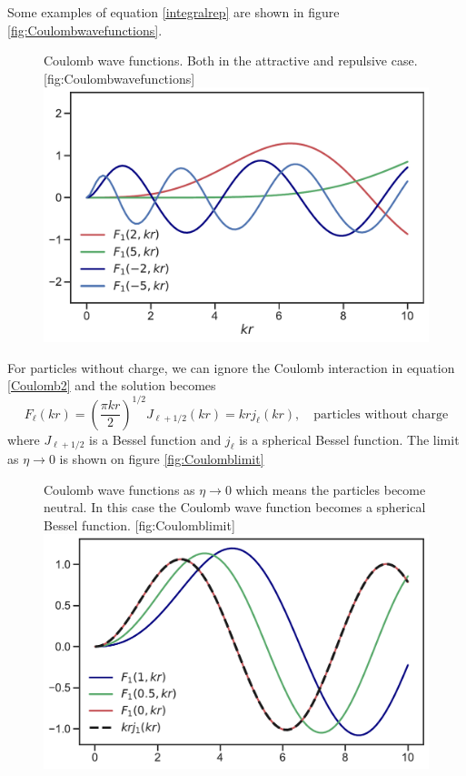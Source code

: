 Some examples of equation \eqref{integralrep} are shown in figure \ref{fig:Coulombwavefunctions}.
\begin{figure}[H]
	\begin{sidecaption}{Coulomb wave functions. Both in the attractive and repulsive case. }[fig:Coulombwavefunctions]
		\includegraphics[width=\linewidth]{Figures/AttRepulCoulomb.pdf}
	\end{sidecaption}
\end{figure}
For particles without charge, we can ignore the Coulomb interaction in equation \eqref{Coulomb2} and the solution becomes \cite{Blatt}
\begin{equation} \label{solcharge}
	F_\ell(kr) = \left( \frac{\pi kr}{2} \right)^{1/2} J_{\ell+1/2}(kr)=kr j_\ell(kr), \quad \text{particles without charge}
\end{equation}
where $J_{\ell+1/2}$ is a Bessel function and $j_\ell$ is a spherical Bessel function. The limit as $\eta\rightarrow 0$ is shown on figure \ref{fig:Coulomblimit}
\begin{figure}[H]
	\begin{sidecaption}{Coulomb wave functions as $\eta\rightarrow 0$ which means the particles become neutral. In this case the Coulomb wave function becomes a spherical Bessel function. }[fig:Coulomblimit]
		\includegraphics[width=\linewidth]{Figures/LimitBessel.pdf}
	\end{sidecaption}
\end{figure}

